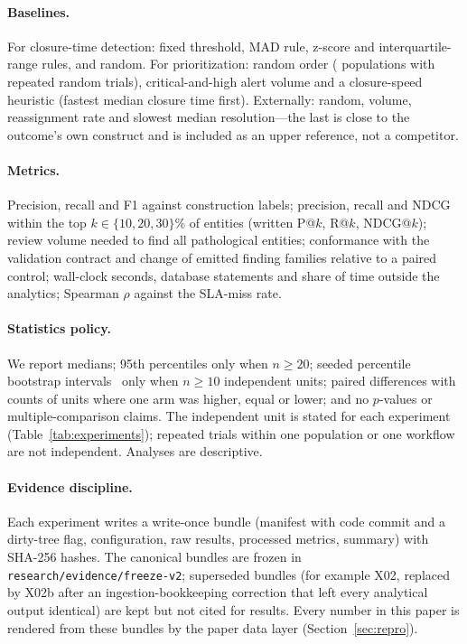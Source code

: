 \paragraph{Baselines.}
For closure-time detection: fixed threshold, MAD rule, z-score and
interquartile-range rules, and random. For prioritization: random order
( populations with repeated random trials), critical-and-high alert volume and a
closure-speed heuristic (fastest median closure time first). Externally: random, volume,
reassignment rate and slowest median resolution---the last is close to the
outcome's own construct and is included as an upper reference, not a competitor.

\paragraph{Metrics.}
Precision, recall and F1 against construction labels; precision, recall and
NDCG~\cite{jarvelin2002ndcg} within the top $k\in\{10,20,30\}$\% of entities
(written P@$k$, R@$k$, NDCG@$k$);
review volume needed to find all pathological entities; conformance with the
validation contract and change of emitted finding families relative to a paired control;
wall-clock seconds, database statements and share of time outside the analytics;
Spearman $\rho$ against the SLA-miss rate.

\paragraph{Statistics policy.}
We report medians; 95th percentiles only when $n\ge20$; seeded percentile
bootstrap intervals~\cite{efron1993bootstrap} only when $n\ge10$ independent
units; paired differences with counts of units where one arm was higher, equal or
lower; and no $p$-values or multiple-comparison claims. The independent unit is
stated for each experiment (Table~\ref{tab:experiments}); repeated trials within
one population or one workflow are not independent. Analyses are descriptive.

\paragraph{Evidence discipline.}
Each experiment writes a write-once bundle (manifest with code commit and a
dirty-tree flag, configuration, raw results, processed metrics, summary) with
SHA-256 hashes. The canonical bundles are frozen in
\texttt{research/evidence/freeze-v2}; superseded bundles (for example X02,
replaced by X02b after an ingestion-bookkeeping correction that left every
analytical output identical) are kept but not cited for results.
Every number in this paper is rendered from these bundles by the paper data layer
(Section~\ref{sec:repro}).
